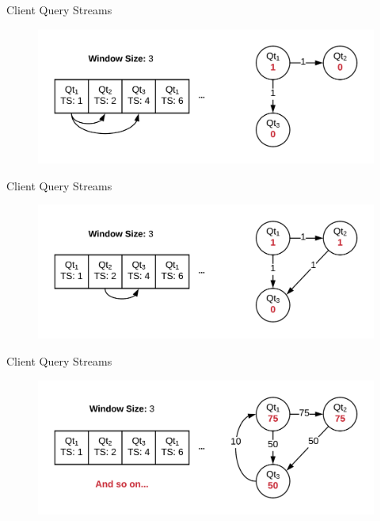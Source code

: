 \documentclass[10pt]{beamer}
\begin{document}
\begin{frame}[fragile]{Client Query Streams}
    \begin{figure}
        \includegraphics[scale=0.2]{apollo_client_query_stream_3}
    \end{figure}
\end{frame}

\begin{frame}[fragile]{Client Query Streams}
    \begin{figure}
        \includegraphics[scale=0.2]{apollo_client_query_stream_4}
    \end{figure}
\end{frame}

\begin{frame}[fragile]{Client Query Streams}
    \begin{figure}
        \includegraphics[scale=0.2]{apollo_client_query_stream_5}
    \end{figure}
\end{frame}
\end{document}
